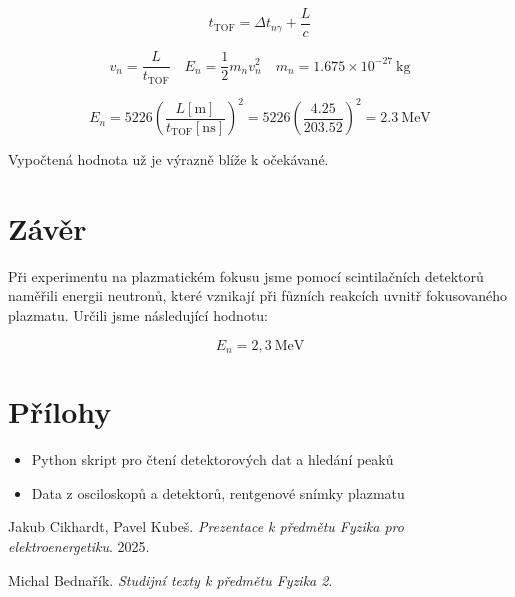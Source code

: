 \documentclass[a4paper,12pt]{article}
\begin{document}
$$
t_{\mathrm{TOF}} = \Delta t_{n\gamma} + \frac{L}{c}
$$

$$
v_n = \frac{L}{t_{\mathrm{TOF}}} \quad E_n = \frac{1}{2} m_n v_n^2 \quad m_n = 1.675 \times 10^{-27}\ \mathrm{kg}
$$

$$
E_n =
5226
\left(
\frac{L[\mathrm{m}]}{t_{\mathrm{TOF}}[\mathrm{ns}]}
\right)^2
=
5226
\left(
\frac{4.25}{203.52}
\right)^2
=
\boxed{ 2.3\ \mathrm{MeV}}
$$


Vypočtená hodnota už je výrazně blíže k očekávané.


\section{Závěr}
Při experimentu na plazmatickém fokusu jsme pomocí scintilačních detektorů naměřili energii neutronů, které vznikají při fůzních reakcích uvnitř fokusovaného plazmatu. Určili jsme následující hodnotu:

$$
E_n = \boxed{2,3 \ \text{MeV}}
$$

\newpage
\section{Přílohy}
\begin{itemize}
    \item Python skript pro čtení detektorových dat a hledání peaků
    \item Data z osciloskopů a detektorů, rentgenové snímky plazmatu
\end{itemize}

\begin{thebibliography}{}

    Jakub Cikhardt, Pavel Kubeš. \textit{Prezentace k předmětu Fyzika pro elektroenergetiku}. 2025.

    Michal Bednařík. \textit{Studijní texty k předmětu Fyzika 2}.

\end{thebibliography}
\end{document}
